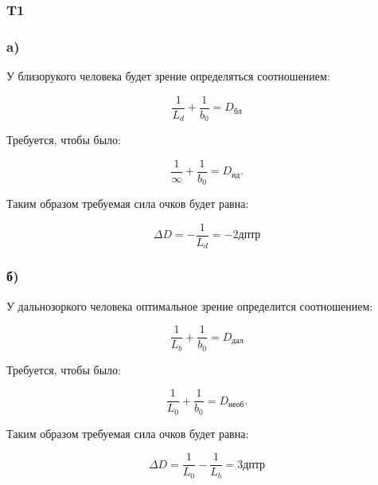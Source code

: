 \subsubsection*{T1}

\subsubsection*{a)}
У близорукого человека будет зрение определяться соотношением:

\begin{equation*}
	\frac{1}{L_d} + \frac{1}{b_0} = D_{бл}
\end{equation*}

Требуется, чтобы было:

\begin{equation*}
	\frac{1}{\infty} + \frac{1}{b_0} = D_{ид}. 
\end{equation*}

Таким образом требуемая сила очков будет равна:

\begin{equation*}
	\Delta D = - \frac{1}{L_d} = -2 дптр
\end{equation*}

\subsubsection*{б)}

У дальнозоркого человека оптимальное зрение определится соотношением:

\begin{equation*}
	\frac{1}{L_b} + \frac{1}{b_0} = D_{дал}
\end{equation*}

Требуется, чтобы было:

\begin{equation*}
	\frac{1}{L_0} + \frac{1}{b_0} = D_{необ}. 
\end{equation*}

Таким образом требуемая сила очков будет равна:

\begin{equation*}
	\Delta D = \frac{1}{L_0} - \frac{1}{L_b} = 3 дптр
\end{equation*}